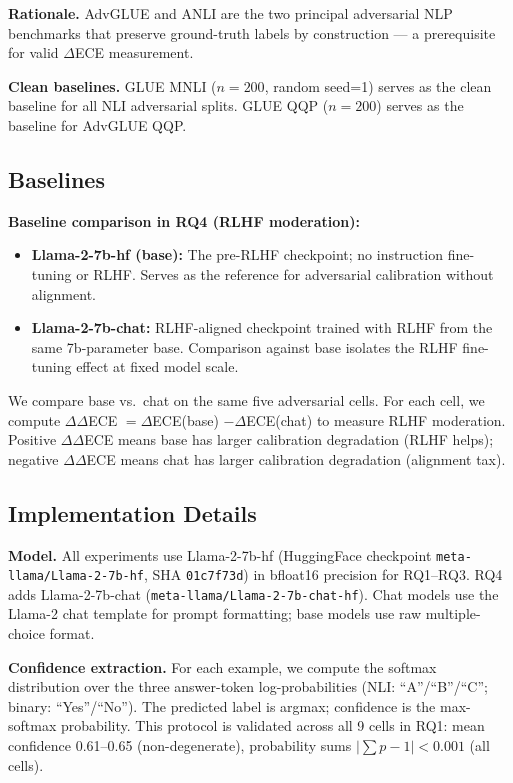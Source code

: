 \textbf{Rationale.} AdvGLUE \citep{wang2021adversarial} and ANLI \citep{nie2020adversarial} are the two principal adversarial NLP benchmarks that preserve ground-truth labels by construction --- a prerequisite for valid $\Delta$ECE measurement.

\textbf{Clean baselines.} GLUE MNLI ($n=200$, random seed=1) serves as the clean baseline for all NLI adversarial splits. GLUE QQP ($n=200$) serves as the baseline for AdvGLUE QQP.

\subsection{Baselines}

\textbf{Baseline comparison in RQ4 (RLHF moderation):}
\begin{itemize}
  \item \textbf{Llama-2-7b-hf (base):} The pre-RLHF checkpoint; no instruction fine-tuning or RLHF. Serves as the reference for adversarial calibration without alignment.
  \item \textbf{Llama-2-7b-chat:} RLHF-aligned checkpoint trained with RLHF from the same 7b-parameter base. Comparison against base isolates the RLHF fine-tuning effect at fixed model scale.
\end{itemize}

We compare base vs.\ chat on the same five adversarial cells. For each cell, we compute $\Delta\Delta$ECE $= \Delta$ECE(base) $- \Delta$ECE(chat) to measure RLHF moderation. Positive $\Delta\Delta$ECE means base has larger calibration degradation (RLHF helps); negative $\Delta\Delta$ECE means chat has larger calibration degradation (alignment tax).

\subsection{Implementation Details}

\textbf{Model.} All experiments use Llama-2-7b-hf (HuggingFace checkpoint \texttt{meta-llama/Llama-2-7b-hf}, SHA \texttt{01c7f73d}) in bfloat16 precision for RQ1--RQ3. RQ4 adds Llama-2-7b-chat (\texttt{meta-llama/Llama-2-7b-chat-hf}). Chat models use the Llama-2 chat template for prompt formatting; base models use raw multiple-choice format.

\textbf{Confidence extraction.} For each example, we compute the softmax distribution over the three answer-token log-probabilities (NLI: ``A''/``B''/``C''; binary: ``Yes''/``No''). The predicted label is argmax; confidence is the max-softmax probability. This protocol is validated across all 9 cells in RQ1: mean confidence 0.61--0.65 (non-degenerate), probability sums $|\sum p - 1| < 0.001$ (all cells).

